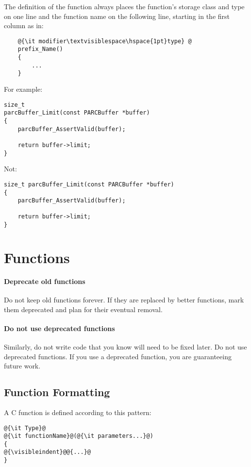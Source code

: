 \documentclass[fleqn,12pt]{PARCOneColumn} %
\newcommand{\visibleindent}{\textvisiblespace\textvisiblespace\textvisiblespace\textvisiblespace}
\begin{document}
The definition of the function always places the function's storage class and type on one line and the function name on the following line, starting in the first column as in:
\begin{lstlisting}
    @{\it modifier\textvisiblespace\hspace{1pt}type} @
    prefix_Name()
    {
        ...
    }
\end{lstlisting}

For example:

\begin{lstlisting}
size_t
parcBuffer_Limit(const PARCBuffer *buffer)
{
	parcBuffer_AssertValid(buffer);

	return buffer->limit;
}
\end{lstlisting}

Not:
\begin{lstlisting}[backgroundcolor=\color{badCodeColor}]
size_t parcBuffer_Limit(const PARCBuffer *buffer)
{
	parcBuffer_AssertValid(buffer);

	return buffer->limit;
}
\end{lstlisting}

\section{Functions}

\paragraph{Deprecate old functions}
Do not keep old functions forever.
If they are replaced by better functions, mark them deprecated and plan for their eventual removal.

\paragraph{Do not use deprecated functions}
Similarly, do not write code that you know will need to be fixed later.
Do not use deprecated functions.
If you use a deprecated function, you are guaranteeing future work.

\subsection{Function Formatting}
A C function is defined according to this pattern:

\begin{lstlisting}
@{\it Type}@
@{\it functionName}@(@{\it parameters...}@)
{
@{\visibleindent}@@{...}@
}
\end{lstlisting}
\end{document}
